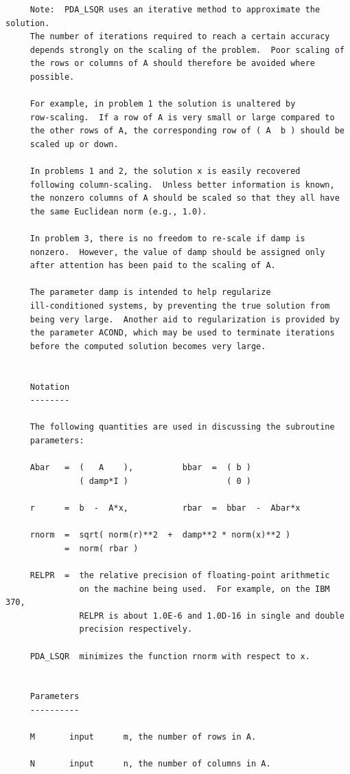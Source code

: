 \documentclass[11pt,twoside]{article}
\begin{document}
\begin{verbatim}
     Note:  PDA_LSQR uses an iterative method to approximate the solution.
     The number of iterations required to reach a certain accuracy
     depends strongly on the scaling of the problem.  Poor scaling of
     the rows or columns of A should therefore be avoided where
     possible.

     For example, in problem 1 the solution is unaltered by
     row-scaling.  If a row of A is very small or large compared to
     the other rows of A, the corresponding row of ( A  b ) should be
     scaled up or down.

     In problems 1 and 2, the solution x is easily recovered
     following column-scaling.  Unless better information is known,
     the nonzero columns of A should be scaled so that they all have
     the same Euclidean norm (e.g., 1.0).

     In problem 3, there is no freedom to re-scale if damp is
     nonzero.  However, the value of damp should be assigned only
     after attention has been paid to the scaling of A.

     The parameter damp is intended to help regularize
     ill-conditioned systems, by preventing the true solution from
     being very large.  Another aid to regularization is provided by
     the parameter ACOND, which may be used to terminate iterations
     before the computed solution becomes very large.


     Notation
     --------

     The following quantities are used in discussing the subroutine
     parameters:

     Abar   =  (   A    ),          bbar  =  ( b )
               ( damp*I )                    ( 0 )

     r      =  b  -  A*x,           rbar  =  bbar  -  Abar*x

     rnorm  =  sqrt( norm(r)**2  +  damp**2 * norm(x)**2 )
            =  norm( rbar )

     RELPR  =  the relative precision of floating-point arithmetic
               on the machine being used.  For example, on the IBM 370,
               RELPR is about 1.0E-6 and 1.0D-16 in single and double
               precision respectively.

     PDA_LSQR  minimizes the function rnorm with respect to x.


     Parameters
     ----------

     M       input      m, the number of rows in A.

     N       input      n, the number of columns in A.


\end{verbatim}
\end{document}
